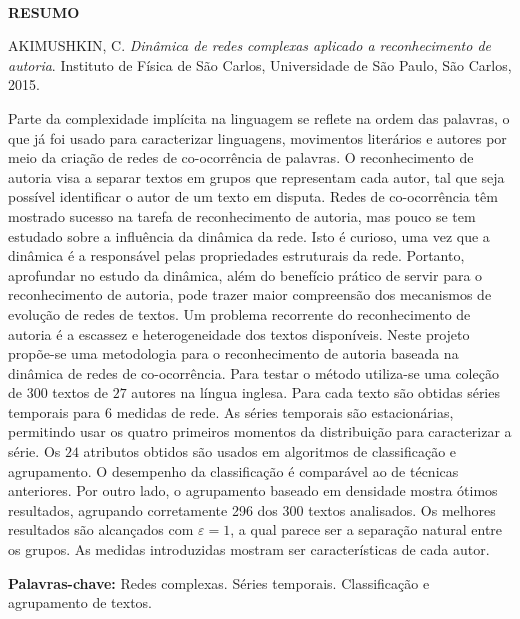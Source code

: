 \documentclass[a4paper,openright,12pt]{report} %
\begin{document}

\newpage\ \thispagestyle{empty}  \newpage\thispagestyle{empty}


\begin{singlespace}

\centerline{\LARGE{{\bf RESUMO}}}

\vspace*{1.5cm}

\hspace*{-0.9cm} AKIMUSHKIN, C. \textit{Din\^amica de redes complexas aplicado a reconhecimento de autoria}. Instituto de Física de São Carlos, Universidade de São Paulo, São Carlos, 2015. 

\vspace*{1.2cm}

\hspace*{-0.9cm}

{\noindent
Parte da complexidade impl\'icita na linguagem se reflete na ordem das palavras, o que j\'a foi usado para caracterizar linguagens, movimentos liter\'arios e autores por meio da cria\c c\~ao de redes de co-ocorr\^encia de palavras. O reconhecimento de autoria visa a separar textos em grupos que representam cada autor, tal que seja poss\'ivel identificar o autor de um texto em disputa. Redes de co-ocorr\^encia t\^em mostrado sucesso na tarefa de reconhecimento de autoria, mas pouco se tem estudado sobre a influ\^encia da din\^amica da rede. Isto \'e curioso, uma vez que a din\^amica \'e a respons\'avel pelas propriedades estruturais da rede. Portanto, aprofundar no estudo da din\^amica, al\'em do benef\'icio pr\'atico de servir para o reconhecimento de autoria, pode trazer maior compreens\~ao dos mecanismos de evolu\c c\~ao de redes de textos. Um problema recorrente do reconhecimento de autoria \'e a escassez e heterogeneidade dos textos dispon\'iveis. Neste projeto prop\~oe-se uma metodologia para o reconhecimento de autoria baseada na din\^amica de redes de co-ocorr\^encia. Para testar o m\'etodo utiliza-se uma cole\c c\~ao de $300$ textos de $27$ autores na l\'ingua inglesa. Para cada texto s\~ao obtidas s\'eries temporais para $6$ medidas de rede. As s\'eries temporais s\~ao estacion\'arias, permitindo usar os quatro primeiros momentos da distribui\c c\~ao para caracterizar a s\'erie. Os $24$ atributos obtidos s\~ao usados em algoritmos de classifica\c c\~ao e agrupamento. O desempenho da classifica\c c\~ao \'e compar\'avel ao de t\'ecnicas anteriores. Por outro lado, o agrupamento baseado em densidade mostra \'otimos resultados, agrupando corretamente 296 dos 300 textos analisados. Os melhores resultados s\~ao alcan\c cados com $\varepsilon=1$, a qual parece ser a separa\c c\~ao natural entre os grupos. As medidas introduzidas mostram ser caracter\'isticas de cada autor.
}

\vspace*{1.5cm}
\hspace*{-0.9cm} {\bf Palavras-chave:} Redes complexas. S\'eries temporais. Classifica\c c\~ao e agrupamento de textos.

\end{singlespace}
\end{document}
